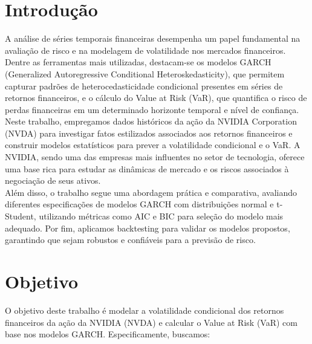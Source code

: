 \documentclass[a4paper, 12pt]{article}
\begin{document}
\newpage


\newpage

\listoffigures
\thispagestyle{empty}

\newpage

\newpage

\thispagestyle{empty}

\newpage

\section{Introdução}
A análise de séries temporais financeiras desempenha um papel fundamental na avaliação de risco e na modelagem de volatilidade nos mercados financeiros. Dentre as ferramentas mais utilizadas, destacam-se os modelos GARCH (Generalized Autoregressive Conditional Heteroskedasticity), que permitem capturar padrões de heterocedasticidade condicional presentes em séries de retornos financeiros, e o cálculo do Value at Risk (VaR), que quantifica o risco de perdas financeiras em um determinado horizonte temporal e nível de confiança.\\

Neste trabalho, empregamos dados históricos da ação da NVIDIA Corporation (NVDA) para investigar fatos estilizados associados aos retornos financeiros e construir modelos estatísticos para prever a volatilidade condicional e o VaR. A NVIDIA, sendo uma das empresas mais influentes no setor de tecnologia, oferece uma base rica para estudar as dinâmicas de mercado e os riscos associados à negociação de seus ativos.\\

Além disso, o trabalho segue uma abordagem prática e comparativa, avaliando diferentes especificações de modelos GARCH com distribuições normal e t-Student, utilizando métricas como AIC e BIC para seleção do modelo mais adequado. Por fim, aplicamos backtesting para validar os modelos propostos, garantindo que sejam robustos e confiáveis para a previsão de risco.

\newpage
\section{Objetivo}
O objetivo deste trabalho é modelar a volatilidade condicional dos retornos financeiros da ação da NVIDIA (NVDA) e calcular o Value at Risk (VaR) com base nos modelos GARCH. Especificamente, buscamos:
\end{document}
